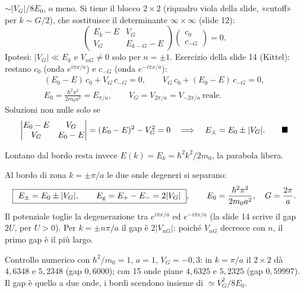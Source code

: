 \documentclass[11pt,a4paper]{article}
\begin{document}
\begin{dimostrazione}[dall'equazione centrale a $E_\pm=E_0\pm|V_G|$]
$\sim|V_G|/8E_0$, o meno. Si tiene il blocco $2\times2$ (riquadro viola della slide, «cutoff» per $k\sim G/2$), che sostituisce il determinante $\infty\times\infty$ (slide 12):
\[
\begin{pmatrix}E_k-E&V_G\\V_G&E_{k-G}-E\end{pmatrix}
\begin{pmatrix}c_0\\c_{-G}\end{pmatrix}=0 .
\]
Ipotesi: $|V_G|\ll E_k$ e $V_{nG}\ne0$ solo per $n=\pm1$. Esercizio della slide 14 (Kittel): restano $c_0$ (onda $e^{i\pi x/a}$) e $c_{-G}$ (onda $e^{-i\pi x/a}$):
\begin{gather*}
(E_0-E)\,c_0+V_G\,c_{-G}=0,\qquad V_G\,c_0+(E_0-E)\,c_{-G}=0,\\
E_0=\frac{\hbar^2\pi^2}{2m_0a^2}=E_{\pi/a},\qquad V_G=V_{2\pi/a}=V_{-2\pi/a}\ \text{reale}.
\end{gather*}
Soluzioni non nulle solo se
\[
\begin{vmatrix}E_0-E&V_G\\V_G&E_0-E\end{vmatrix}=(E_0-E)^2-V_G^2=0
\quad\Longrightarrow\quad E_\pm=E_0\pm|V_G| .\qed
\]
\end{dimostrazione}
Lontano dal bordo resta invece $E(k)=E_k=\hbar^2k^2/2m_0$, la parabola libera.

\begin{chiave}[Il gap dal calcolo: $\Eg=2|V_G|$]
Al bordo di zona $k=\pm\pi/a$ le due onde degeneri si separano:
\[
\boxed{\ E_\pm=E_0\pm|V_G|,\qquad \Eg=E_+-E_-=2|V_G|\ },\qquad E_0=\frac{\hbar^2\pi^2}{2m_0a^2},\quad G=\frac{2\pi}a.
\]
Il potenziale toglie la degenerazione tra $e^{i\pi x/a}$ ed $e^{-i\pi x/a}$ (la slide 14 scrive il gap $2U$, per $U>0$). Per $k=\pm n\pi/a$ il gap è $2|V_{nG}|$:
poiché $V_{nG}$ decresce con $n$, il primo gap è il più largo.
\end{chiave}

\begin{approfondimento}
Controllo numerico con $\hbar^2/m_0=1$, $a=1$, $V_G=-0{,}3$: in $k=\pi/a$ il $2\times2$ dà $4{,}6348$ e $5{,}2348$ (gap $0{,}6000$); con 15 onde piane $4{,}6325$ e
$5{,}2325$ (gap $0{,}59997$). Il gap è quello a due onde, i bordi scendono insieme di $\simeq V_G^2/8E_0$.
\end{approfondimento}
\end{document}

